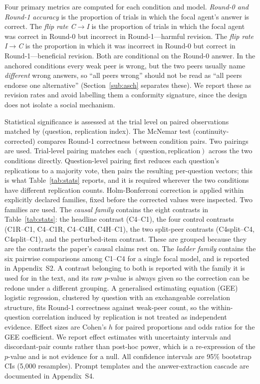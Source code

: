 \documentclass[11pt]{article}
\begin{document}
Four primary metrics are computed for each condition and model.
\textit{Round-0 and Round-1 accuracy} is the proportion of trials in which
the focal agent's answer is correct.
The \textit{flip rate C$\rightarrow$I} is the proportion of trials in which
the focal agent was correct in Round-0 but incorrect in Round-1---harmful
revision.
The \textit{flip rate I$\rightarrow$C} is the proportion in which it was
incorrect in Round-0 but correct in Round-1---beneficial revision.
Both are conditional on the Round-0 answer.
In the anchored conditions every weak peer is wrong, but the two peers usually
name \emph{different} wrong answers, so ``all peers wrong'' should not be read
as ``all peers endorse one alternative''
(Section~\ref{sub:asch} separates these).
We report these as revision rates and avoid labelling them a conformity
signature, since the design does not isolate a social mechanism.

Statistical significance is assessed at the trial level on paired
observations matched by (question, replication index).
The McNemar test (continuity-corrected) compares Round-1 correctness
between condition pairs.
Two pairings are used.
Trial-level pairing matches each
$(\text{question}, \text{replication})$ across the two conditions directly.
Question-level pairing first reduces each question's replications to a
majority vote, then pairs the resulting per-question vectors; this is what
Table~\ref{tab:stats} reports, and it is required wherever the two conditions
have different replication counts.
Holm-Bonferroni correction is applied within explicitly declared families,
fixed before the corrected values were inspected.
Two families are used.
The \emph{causal family} contains the eight contrasts in
Table~\ref{tab:stats}: the headline contrast (C4--C1), the four control
contrasts (C1R--C1, C4--C1R, C4--C4H, C4H--C1), the two split-peer contrasts
(C4split--C4, C4split--C1), and the perturbed-item contrast.
These are grouped because they are the contrasts the paper's causal claims rest
on.
The \emph{ladder family} contains the six pairwise comparisons among C1--C4 for
a single focal model, and is reported in Appendix~S2.
A contrast belonging to both is reported with the family it is used for in the
text, and its raw $p$-value is always given so the correction can be redone
under a different grouping.
A generalised estimating equation (GEE) logistic regression, clustered by
question with an exchangeable correlation structure, fits Round-1 correctness
against weak-peer count, so the within-question correlation induced by
replication is not treated as independent evidence.
Effect sizes are Cohen's $h$ for paired proportions and odds ratios for the
GEE coefficient. We report effect estimates with uncertainty intervals and
discordant-pair counts rather than post-hoc power, which is a
re-expression of the $p$-value and is not evidence for a null.
All confidence intervals are 95\% bootstrap CIs (5{,}000 resamples).
Prompt templates and the answer-extraction cascade are documented in
Appendix~S4.
\end{document}
